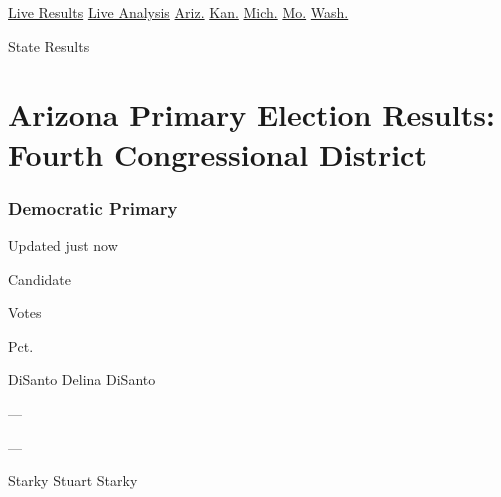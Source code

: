 \href{https://www.nytimes.com/interactive/2020/08/04/us/elections/results-arizona-kansas-michigan-missouri-primaries.html?action=click\&module=ELEX_results\&pgtype=Interactive\&region=Navigation}{Live
Results}
\href{https://www.nytimes.com/interactive/2020/08/04/us/elections/live-analysis-arizona-kansas-michigan-missouri-primaries.html?action=click\&module=ELEX_results\&pgtype=Interactive\&region=Navigation}{Live
Analysis}
\href{https://www.nytimes.com/interactive/2020/08/04/us/elections/results-arizona-primary-elections.html?action=click\&module=ELEX_results\&pgtype=Interactive\&region=Navigation}{Ariz.}
\href{https://www.nytimes.com/interactive/2020/08/04/us/elections/results-kansas-primary-elections.html?action=click\&module=ELEX_results\&pgtype=Interactive\&region=Navigation}{Kan.}
\href{https://www.nytimes.com/interactive/2020/08/04/us/elections/results-michigan-primary-elections.html?action=click\&module=ELEX_results\&pgtype=Interactive\&region=Navigation}{Mich.}
\href{https://www.nytimes.com/interactive/2020/08/04/us/elections/results-missouri-primary-elections.html?action=click\&module=ELEX_results\&pgtype=Interactive\&region=Navigation}{Mo.}
\href{https://www.nytimes.com/interactive/2020/08/04/us/elections/results-washington-primary-elections.html?action=click\&module=ELEX_results\&pgtype=Interactive\&region=Navigation}{Wash.}

 State Results

\hypertarget{arizona-primary-election-results-fourth-congressional-district-1}{%
\section{Arizona Primary Election Results: Fourth Congressional
District}\label{arizona-primary-election-results-fourth-congressional-district-1}}

\hypertarget{democratic-primary}{%
\subsubsection{Democratic Primary}\label{democratic-primary}}

Updated just now

Candidate

Votes

Pct.

 DiSanto Delina DiSanto

---

---

 Starky Stuart Starky

